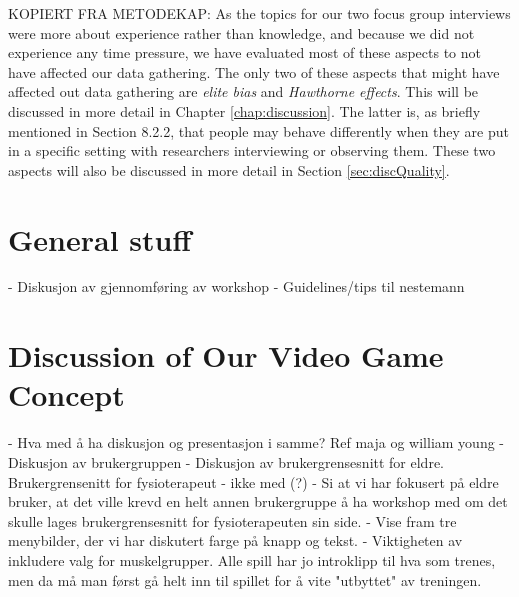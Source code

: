 KOPIERT FRA METODEKAP:  As the topics for our two focus group interviews were more about experience rather than knowledge, and because we did not experience any time pressure, we have evaluated most of these aspects to not have affected our data gathering. The only two of these aspects that might have affected out data gathering are \emph{elite bias} and \emph{Hawthorne effects}. This will be discussed in more detail in Chapter \ref{chap:discussion}.  The latter is, as briefly mentioned in Section 8.2.2, that people may behave differently when they are put in a specific setting with researchers interviewing or observing them. These two aspects will also be discussed in more detail in Section \ref{sec:discQuality}.

\section{General stuff}
- Diskusjon av gjennomføring av workshop
- Guidelines/tips til nestemann

\section{Discussion of Our Video Game Concept}
- Hva med å ha diskusjon og presentasjon i samme? Ref maja og william young
- Diskusjon av brukergruppen
- Diskusjon av brukergrensesnitt for eldre. Brukergrensenitt for fysioterapeut - ikke med (?)
- Si at vi har fokusert på eldre bruker, at det ville krevd en helt annen brukergruppe å ha workshop med om det skulle lages brukergrensesnitt for fysioterapeuten sin side.
- Vise fram tre menybilder, der vi har diskutert farge på knapp og tekst. 
- Viktigheten av inkludere valg for muskelgrupper. Alle spill har jo introklipp til hva som trenes, men da må man først gå helt inn til spillet for å vite "utbyttet" av treningen.
